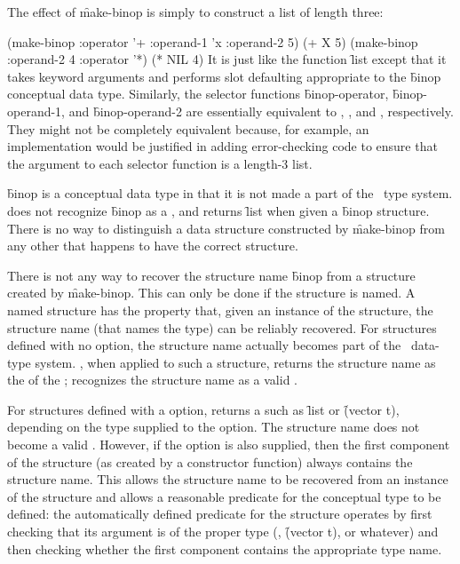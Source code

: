 The effect of \f{make-binop} is simply to construct a list of length three:

\code
 (make-binop :operator '+ :operand-1 'x :operand-2 5) \EV (+ X 5)  
 (make-binop :operand-2 4 :operator '*) \EV (* NIL 4)
\endcode
It is just like the function \f{list} except that it takes
keyword arguments and performs slot defaulting appropriate to the \f{binop}
conceptual data type.  Similarly, the selector functions
\f{binop-operator}, \f{binop-operand-1},
and \f{binop-operand-2} are essentially equivalent to ,
, and , respectively.  They might not be
completely equivalent because,
for example, an implementation would be justified in adding error-checking
code to ensure that the argument to each selector function is a length-3
list.

\f{binop} is a conceptual data type in that it is not made a part of
the \clisp\ type system.   does not recognize \f{binop} as
a , and  returns \f{list} when
given a \f{binop} structure.  There is no way to distinguish a data
structure constructed by \f{make-binop} from any other  that 
happens to have the correct structure.

There is not any way to recover the structure name \f{binop} from
a structure created by \f{make-binop}.  This can only be done
if the structure is named.
A named structure has the property that, given an instance of the
structure, the structure name (that names the type) can be reliably
recovered.  For structures defined
with no  option, the structure name actually becomes part
of the \clisp\ data-type system.  ,
when applied to such a structure, returns the structure name
as the  of the ;
 recognizes
the structure name as a valid .

For structures defined with a  option,  
returns a  such as \f{list} or \f{(vector t)},
depending on the type supplied to the  option.
The structure name does not become a valid .
However,
if the  option is also supplied, then the first component
of the structure (as created by a  constructor function)
always contains the structure name.  This allows the structure name
to be recovered from an instance of the structure and allows a reasonable
predicate for the conceptual type to be defined:
the automatically defined
 predicate for the structure operates by first
checking that its argument is of the proper type (, 
\f{(vector t)},
or whatever) and then checking whether the first component contains
the appropriate type name.

